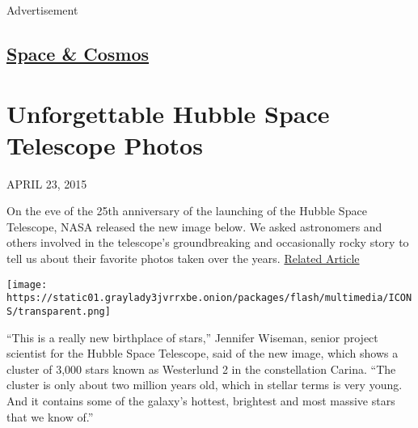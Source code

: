 Advertisement

\hypertarget{-space--cosmos-}{%
\subsection{\texorpdfstring{
\href{https://www.nytimes3xbfgragh.onion/section/science/space}{Space \&
Cosmos} }{ Space \& Cosmos }}\label{-space--cosmos-}}

\hypertarget{unforgettable-hubble-space-telescope-photos}{%
\section{Unforgettable Hubble Space Telescope
Photos}\label{unforgettable-hubble-space-telescope-photos}}

APRIL 23, 2015

On the eve of the 25th anniversary of the launching of the Hubble Space
Telescope, NASA released the new image below. We asked astronomers and
others involved in the telescope's groundbreaking and occasionally rocky
story to tell us about their favorite photos taken over the years.
\href{https://www.nytimes3xbfgragh.onion/video/science/100000003647066/hubble-reflects-the-cosmos.html}{Related
Article}

\texttt{[image: https://static01.graylady3jvrrxbe.onion/packages/flash/multimedia/ICONS/transparent.png]}

``This is a really new birthplace of stars,'' Jennifer Wiseman, senior
project scientist for the Hubble Space Telescope, said of the new image,
which shows a cluster of 3,000 stars known as Westerlund 2 in the
constellation Carina. ``The cluster is only about two million years old,
which in stellar terms is very young. And it contains some of the
galaxy's hottest, brightest and most massive stars that we know of.''

